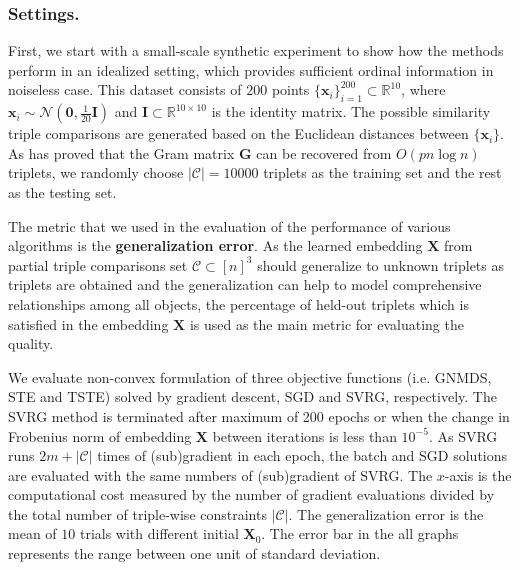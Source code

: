 \documentclass[letterpaper]{article}
\begin{document}
		\subsubsection{Settings.}
		First, we start with a small-scale synthetic experiment to show how the methods perform in an idealized setting, which provides sufficient ordinal information in noiseless case. This dataset consists of $200$ points $\{\mathbf{x}_i\}_{i=1}^{200}\subset\mathbb{R}^{10}$, where $\mathbf{x}_i\sim\mathcal{N}(\mathbf{0}, \frac{1}{20}\mathbf{I})$ and $\mathbf{I}\subset\mathbb{R}^{10\times 10}$ is the identity matrix. The possible similarity triple comparisons are generated based on the Euclidean distances between $\{\mathbf{x}_i\}$. As \cite{2016arXiv160607081J} has proved that the Gram matrix $\mathbf{G}$ can be recovered from $O(pn\log n)$ triplets, we randomly choose $|\mathcal{C}|=10000$ triplets as the training set and the rest as the testing set.

		The metric that we used in the evaluation of the performance of various algorithms is the \textbf{generalization error}. As the learned embedding $\mathbf{X}$ from partial triple comparisons set $\mathcal{C}\subset[n]^3$ should generalize to unknown triplets as triplets are obtained and the generalization can help to model comprehensive relationships among all objects, the percentage of held-out triplets which is satisfied in the embedding $\mathbf{X}$ is used as the main metric for evaluating the quality.

		We evaluate non-convex formulation of three objective functions (i.e. GNMDS, STE and TSTE) solved by gradient descent, SGD and SVRG, respectively.
		The SVRG method is terminated after maximum of 200 epochs or when the change in Frobenius norm of embedding $\mathbf{X}$ between iterations is less than $10^{-5}$. As SVRG runs $2m+|\mathcal{C}|$ times of (sub)gradient in each epoch, the batch and SGD solutions are evaluated with the same numbers of (sub)gradient of SVRG. The $x$-axis is the computational cost measured by the number of gradient evaluations divided by the total number of triple-wise constraints $|\mathcal{C}|$. The generalization error is the mean of $10$ trials with different initial $\mathbf{X}_0$. The error bar in the all graphs represents the range between one unit of standard deviation.
\end{document}
